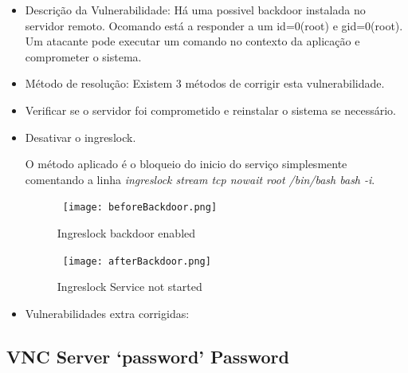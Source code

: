 \begin{itemize}
\item Descrição da Vulnerabilidade: Há uma possivel backdoor instalada no servidor remoto. Ocomando está a responder a um id=0(root) e gid=0(root). Um atacante pode executar um comando no contexto da aplicação e comprometer o sistema.

\item Método de resolução: Existem 3 métodos de corrigir esta vulnerabilidade.

\par\item Verificar se o servidor foi comprometido e reinstalar o sistema se necessário. 
\par\item Desativar o ingreslock.
\par O método aplicado é o bloqueio do inicio do serviço simplesmente comentando a linha \textit{ingreslock stream tcp nowait root /bin/bash bash -i}.
\begin{figure}[H]

  \centering

  \hbox{\hspace{-6em} \texttt{[image: beforeBackdoor.png]}}

  \caption {Ingreslock backdoor enabled}

  \label {fig3}

\end{figure}
\begin{figure}[H]

  \centering

  \hbox{\hspace{-6em} \texttt{[image: afterBackdoor.png]}}

  \caption {Ingreslock Service not started}

  \label {fig3}

\end{figure}
\item Vulnerabilidades extra corrigidas:
\end{itemize}

\subsection{VNC Server ‘password’ Password}


